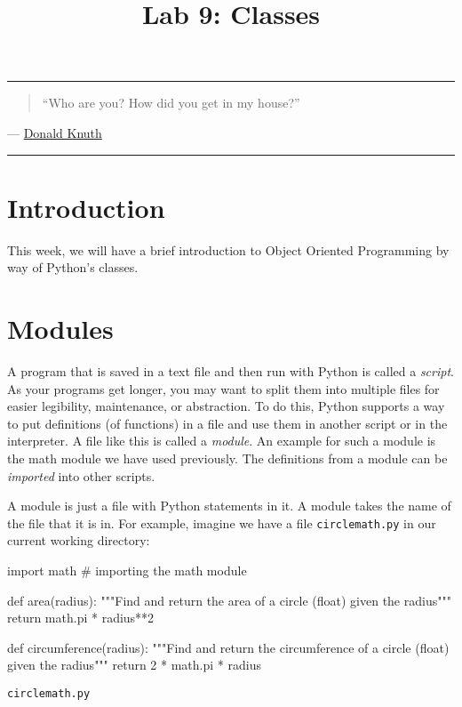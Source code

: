 \documentclass[11pt]{cselabheader}
\title{Lab 9: Classes}
\begin{document}
\maketitle
{}
\hrule

\begin{quotation}
``Who are you? How did you get in my house?''
\end{quotation}
\begin{flushright}
  --- \href{https://xkcd.com/163/}{Donald Knuth}
\end{flushright}

\hrule

\section{Introduction}
This week, we will have a brief introduction to Object Oriented Programming by
way of Python's classes.

\pagebreak
\tableofcontents
\pagebreak
{}

\section{Modules}
\label{sec:modules}

A program that is saved in a text file and then run with Python is called a
\emph{script}. As your programs get longer, you may want to split them into
multiple files for easier legibility, maintenance, or abstraction. To do this,
Python supports a way to put definitions (of functions) in a file and use them
in another script or in the interpreter. A file like this is called a
\emph{module}. An example for such a module is the math module we have used
previously. The definitions from a module can be \emph{imported} into other
scripts.

A module is just a file with Python statements in it. A module takes the name of
the file that it is in. For example, imagine we have a file
\texttt{circlemath.py} in our current working directory:

\begin{listing}[H]
\vspace{-0.5em}
\begin{python3code}
import math # importing the math module

def area(radius):
    """Find and return the area of a circle (float) given the radius"""
    return math.pi * radius**2

def circumference(radius):
    """Find and return the circumference of a circle (float) given the radius"""
    return 2 * math.pi * radius
\end{python3code}
\vspace{-1em}
\caption{\texttt{circlemath.py}}
\vspace{-0.5em}
\end{listing}
\end{document}
